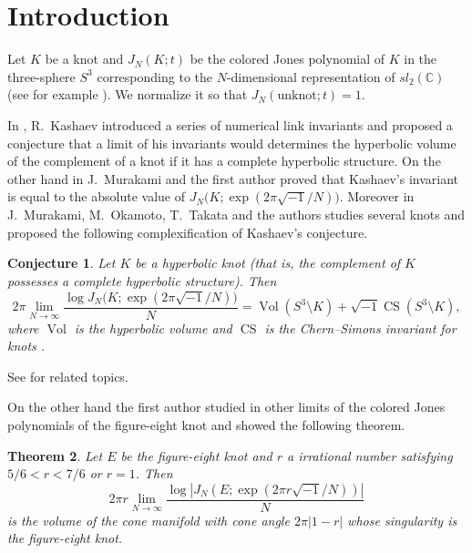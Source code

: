\documentclass[a4paper]{amsart}
\theoremstyle{plain}
\newtheorem{thm}{Theorem}[section]
\newtheorem{conj}[thm]{Conjecture}
\theoremstyle{definition}
\theoremstyle{remark}
\newcommand{\C}{\mathbb{C}}
\newcommand{\Vol}{\operatorname{Vol}}
\newcommand{\CS}{\operatorname{CS}}
\numberwithin{equation}{section}
\begin{document}
\section{Introduction}
Let $K$ be a knot and $J_N(K;t)$ be the colored Jones polynomial of $K$ in
the three-sphere $S^3$ corresponding to the $N$-dimensional representation of
$sl_2(\C)$ (see for example \cite{Kirby/Melvin:INVEM91}).
We normalize it so that $J_N(\text{unknot};t)=1$.
\par
In \cite{Kashaev:LETMP97}, R.~Kashaev introduced a series of numerical link
invariants and proposed a conjecture that a limit of his invariants would
determines the hyperbolic volume of the complement of a knot if it has a
complete hyperbolic structure.
On the other hand in \cite{Murakami/Murakami:ACTAM101} J.~Murakami and the first
author proved that Kashaev's invariant is equal to the absolute value of
$J_N\bigl(K;\exp(2\pi\sqrt{-1}/N)\bigr)$.
Moreover in \cite{Murakami/Murakami/Okamoto/Takata/Yokota:EXPMA02} J.~Murakami,
M.~Okamoto, T.~Takata and the authors studies several knots and proposed the
following complexification of Kashaev's conjecture.
\begin{conj}
Let $K$ be a hyperbolic knot (that is, the complement of $K$ possesses a
complete hyperbolic structure).
Then
\begin{equation*}
  2\pi\lim_{N\to\infty}\frac{\log{J_N\bigl(K;\exp(2\pi\sqrt{-1}/N)\bigr)}}{N}
  =
  \Vol(S^3\setminus{K})+\sqrt{-1}\CS(S^3\setminus{K}),
\end{equation*}
where $\Vol$ is the hyperbolic volume and $\CS$ is the Chern--Simons
invariant for knots \cite{Meyerhoff:density}.
\end{conj}
See
\cite{Murakami:ALDT_VI,
Murakami:Nagoya99,
D.Thurston:Grenoble,
Yokota:Murasugi70,
Yokota:volume00,
Yokota:Topology_Symposium2000,
Yokota:GTM02,
Yokota:INTIS03}
for related topics.
\par
On the other hand the first author studied in \cite{Murakami:KYUMJ2004} other limits
of the colored Jones polynomials of the figure-eight knot and showed the
following theorem.
\begin{thm}\label{thm:real}
Let $E$ be the figure-eight knot and $r$ a irrational number satisfying
${5/6}<{r}<{7/6}$ or $r=1$.
Then
\begin{equation*}
  2\pi{r}\lim_{N\to\infty}
  \frac{\log\left|J_N\left(E;\exp(2\pi{r}\sqrt{-1}/N)\right)\right|}{N}
\end{equation*}
is the volume of the cone manifold with cone angle $2\pi|1-r|$
whose singularity is the figure-eight knot.
\end{thm}
\end{document}
